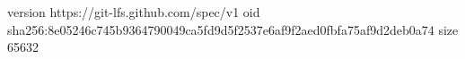version https://git-lfs.github.com/spec/v1
oid sha256:8e05246c745b9364790049ca5fd9d5f2537e6af9f2aed0fbfa75af9d2deb0a74
size 65632
